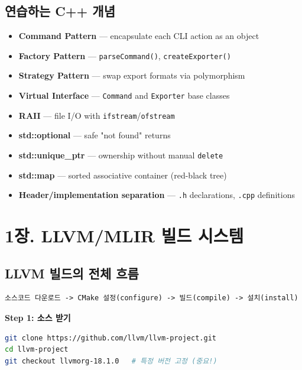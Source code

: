 \documentclass[11pt,a4paper]{article}
\begin{document}
\subsection{연습하는 C++ 개념}
\begin{itemize}[nosep]
\item \textbf{Command Pattern} --- encapsulate each CLI action as an object
\item \textbf{Factory Pattern} --- \texttt{parseCommand()}, \texttt{createExporter()}
\item \textbf{Strategy Pattern} --- swap export formats via polymorphism
\item \textbf{Virtual Interface} --- \texttt{Command} and \texttt{Exporter} base classes
\item \textbf{RAII} --- file I/O with \texttt{ifstream}/\texttt{ofstream}
\item \textbf{std::optional} --- safe "not found" returns
\item \textbf{std::unique\_ptr} --- ownership without manual \texttt{delete}
\item \textbf{std::map} --- sorted associative container (red-black tree)
\item \textbf{Header/implementation separation} --- \texttt{.h} declarations, \texttt{.cpp} definitions
\end{itemize}

\newpage

\section{1장. LLVM/MLIR 빌드 시스템}

\subsection{LLVM 빌드의 전체 흐름}

\begin{lstlisting}
소스코드 다운로드 -> CMake 설정(configure) -> 빌드(compile) -> 설치(install)
\end{lstlisting}

\textbf{Step 1: 소스 받기}
\begin{lstlisting}[language=bash]
git clone https://github.com/llvm/llvm-project.git
cd llvm-project
git checkout llvmorg-18.1.0   # 특정 버전 고정 (중요!)
\end{lstlisting}
\end{document}
